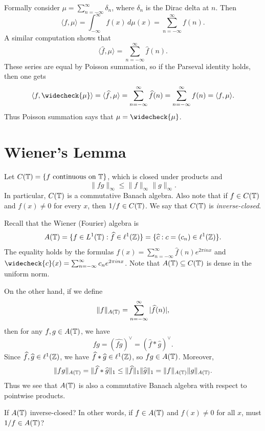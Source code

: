 \begin{remark}
  Formally consider
  $\mu = \sum_{n = -\infty}^\infty \delta_n$,
  where $\delta_n$ is the
  Dirac delta at $n$. Then
  \[
    \langle f, \mu \rangle
    = \int_{-\infty}^\infty f(x)\, d\mu(x)
    = \sum_{n = -\infty}^\infty f(n).
  \]
  A similar computation shows that
  \[
    \langle \widehat{f}, \mu \rangle
    = \sum_{n = -\infty}^\infty \widehat{f}(n).
  \]
  These series are equal by
  Poisson summation, so
  if the Parseval identity holds,
  then one gets
  \[
    \langle f, \widecheck{\mu} \rangle
    = \langle \widehat{f}, \mu \rangle
    = \sum_{n = -\infty}^\infty \widehat{f}(n)
    = \sum_{n = -\infty}^\infty f(n)
    = \langle f, \mu \rangle.
  \]
  Thus Poisson summation says that
  $\mu = \widecheck{\mu}$.
\end{remark}

\section{Wiener's Lemma}

\begin{remark}
  Let
  $C(\mathbb{T}) = \{f \text{ continuous on } \mathbb{T}\}$,
  which is closed under products and
  \[
    \|fg\|_\infty \le \|f\|_\infty \|g\|_\infty.
  \]
  In particular,
  $C(\mathbb{T})$ is a commutative
  Banach algebra. Also note
  that if $f \in C(\mathbb{T})$ and
  $f(x) \ne 0$ for every $x$, then
  $1 / f \in C(\mathbb{T})$. We say that
  $C(\mathbb{T})$ is \emph{inverse-closed}.

  Recall that the Wiener (Fourier)
  algebra is
  \[
    A(\mathbb{T}) = \{f \in L^1(\mathbb{T}) : \widehat{f} \in \ell^1(\mathbb{Z})\}
    = \{\widehat{c} : c = (c_n) \in \ell^1(\mathbb{Z})\}.
  \]
  The equality holds by the
  formulas $f(x) = \sum_{n = -\infty}^\infty \widehat{f}(n) e^{2\pi i n x}$
  and $\widecheck{c}(x) = \sum_{n = -\infty}^\infty c_n e^{2\pi i n x}$.
  Note that
  $A(\mathbb{T}) \subseteq C(\mathbb{T})$ is
  dense in the uniform norm.

  On the other hand, if we define
  \[
    \|f\|_{A(\mathbb{T})}
    = \sum_{n = -\infty}^\infty |\widehat{f}(n)|,
  \]
  then for any $f, g \in A(\mathbb{T})$,
  we have
  \[
    f g = (\widehat{fg})^\vee
    = (\widehat{f} * \widehat{g})^\vee.
  \]
  Since $\widehat{f}, \widehat{g} \in \ell^1(\mathbb{Z})$,
  we have $\widehat{f} * \widehat{g} \in \ell^1(\mathbb{Z})$,
  so $fg \in A(\mathbb{T})$. Moreover,
  \[
    \|fg\|_{A(\mathbb{T})}
    = \|\widehat{f} * \widehat{g}\|_1
    \le \|\widehat{f}\|_1 \|\widehat{g}\|_1
    = \|f\|_{A(\mathbb{T})} \|g\|_{A(\mathbb{T})}.
  \]
  Thus we see that
  $A(\mathbb{T})$ is also a commutative
  Banach algebra
  with respect to pointwise products.

  If $A(\mathbb{T})$ inverse-closed?
  In other words, if $f \in A(\mathbb{T})$
  and $f(x) \ne 0$ for all $x$,
  must $1 / f \in A(\mathbb{T})$?
\end{remark}

